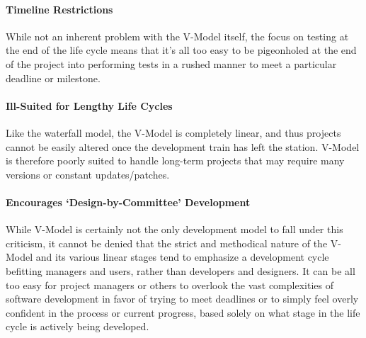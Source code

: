 \documentclass[main.tex]{subfiles}
\begin{document}
\paragraph{Timeline Restrictions}
While not an inherent problem with the V-Model itself, the focus on testing at the end of the life cycle means that it’s all too easy to be pigeonholed at the end of the project into performing tests in a rushed manner to meet a particular deadline or milestone.

\paragraph{Ill-Suited for Lengthy Life Cycles}
Like the waterfall model, the V-Model is completely linear, and thus projects cannot be easily altered once the development train has left the station.
V-Model is therefore poorly suited to handle long-term projects that may require many versions or constant updates/patches.

\paragraph{Encourages ‘Design-by-Committee’ Development}
While V-Model is certainly not the only development model to fall under this criticism, it cannot be denied that the strict and methodical nature of the V-Model and its various linear stages tend to emphasize a development cycle befitting managers and users, rather than developers and designers.
It can be all too easy for project managers or others to overlook the vast complexities of software development in favor of trying to meet deadlines or to simply feel overly confident in the process or current progress, based solely on what stage in the life cycle is actively being developed.

\nocite{*}
\end{document}
